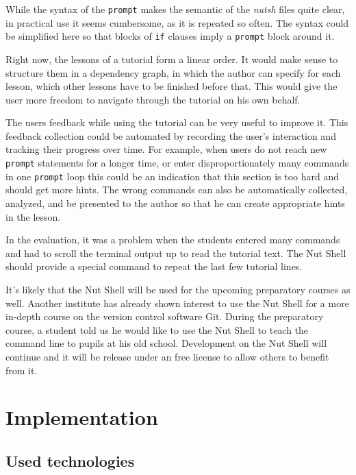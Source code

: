 \documentclass[paper=a4,twoside,abstract=on,cleardoublepage=empty,numbers=noenddot,toc=bib,12pt,appendixprefix=true]{scrreprt}
\begin{document}
While the syntax of the \texttt{prompt} makes the semantic of the \emph{nutsh} files quite clear, in practical use it seems cumbersome, as it is repeated so often. The syntax could be simplified here so that blocks of \texttt{if} clauses imply a \texttt{prompt} block around it.

Right now, the lessons of a tutorial form a linear order. It would make sense to structure them in a dependency graph, in which the author can specify for each lesson, which other lessons have to be finished before that. This would give the user more freedom to navigate through the tutorial on his own behalf.



The users feedback while using the tutorial can be very useful to improve it. This feedback collection could be automated by recording the user's interaction and tracking their progress over time. For example, when users do not reach new \texttt{prompt} statements for a longer time, or enter disproportionately many commands in one \texttt{prompt} loop this could be an indication that this section is too hard and should get more hints. The wrong commands can also be automatically collected, analyzed, and be presented to the author so that he can create appropriate hints in the lesson.

In the evaluation, it was a problem when the students entered many commands and had to scroll the terminal output up to read the tutorial text. The Nut Shell should provide a special command to repeat the last few tutorial lines.

It's likely that the Nut Shell will be used for the upcoming preparatory courses as well. Another institute has already shown interest to use the Nut Shell for a more in-depth course on the version control software Git. During the preparatory course, a student told us he would like to use the Nut Shell to teach the command line to pupils at his old school. Development on the Nut Shell will continue and it will be release under an free license to allow others to benefit from it.

\cleardoublepage
\appendix

\chapter{Implementation}
\label{sec:implementation}

\section*{Used technologies}
\end{document}
